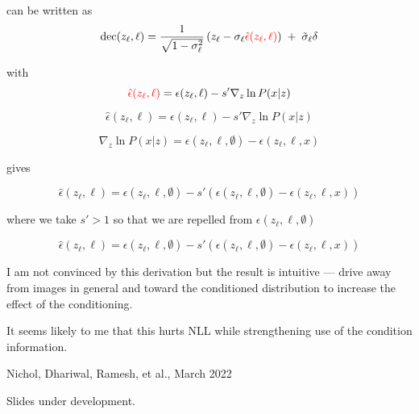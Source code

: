 {can be written as
$$\mathrm{dec}(z_\ell,\ell) = \frac{1}{\sqrt{1-\sigma_\ell^2}}\left(z_\ell - \sigma_\ell {\color{red} \hat{\epsilon}(z_\ell,\ell)}\right)\; +\; \tilde{\sigma}_\ell\delta$$

with
$${\color{red} \hat{\epsilon}(z_\ell,\ell)} = \epsilon(z_\ell,\ell) - s'\nabla_z \ln P(x|z)$$

$$\hat{\epsilon}(z_\ell,\ell) = \epsilon(z_\ell,\ell) - s'\nabla_z \ln P(x|z)$$

$$\nabla_z \ln P(x|z) = \epsilon(z_\ell,\ell,\emptyset) - \epsilon(z_\ell,\ell,x)$$

gives

$$\hat{\epsilon}(z_\ell,\ell) = \epsilon(z_\ell,\ell,\emptyset) - s'(\epsilon(z_\ell,\ell,\emptyset) - \epsilon(z_\ell,\ell,x))$$

\vfill
where we take $s' > 1$ so that we are repelled from $\epsilon(z_\ell,\ell,\emptyset)$


$$\hat{\epsilon}(z_\ell,\ell) = \epsilon(z_\ell,\ell,\emptyset) - s'(\epsilon(z_\ell,\ell,\emptyset) - \epsilon(z_\ell,\ell,x))$$

\vfill
I am not convinced by this derivation but the result is intuitive --- drive away from images in general and toward the conditioned distribution to increase the effect of the conditioning.

\vfill
It seems likely to me that this hurts NLL while strengthening use of the condition information.

         {Nichol, Dhariwal, Ramesh, et al., March 2022}

Slides under development.


}

